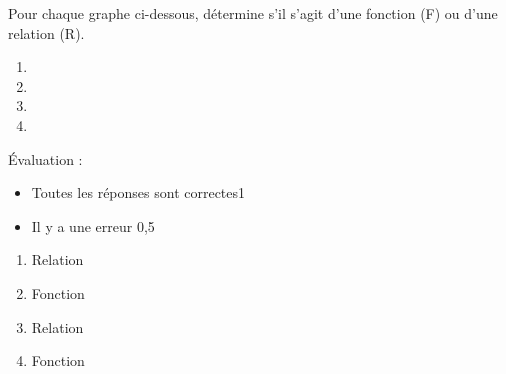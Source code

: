 \documentclass[../partie1.tex]{subfiles}
\begin{document}
\begin{exercise}[points=1]
    Pour chaque graphe ci-dessous, détermine s'il s'agit d'une fonction (F) ou d'une relation (R).
    \begin{enumerate}[cols=4]
        \item \blank[width=2cm]{} 
        \item \blank[width=2cm]{} 
        \item \blank[width=2cm]{} 
        \item \blank[width=2cm]{} 
    \end{enumerate}
\end{exercise}
\begin{solution}
    Évaluation : 
    \begin{itemize}
        \item Toutes les réponses sont correctes\hfill 1
        \item Il y a une erreur \hfill 0,5
    \end{itemize}
    \begin{enumerate}[cols=4]
        \item Relation
        \item Fonction
        \item Relation
        \item Fonction
    \end{enumerate}
\end{solution}
\newpage
\end{document}
